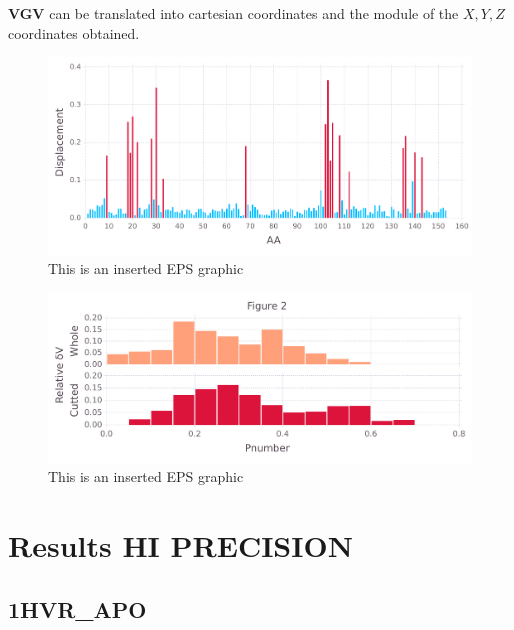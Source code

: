 \documentclass[10pt,letterpaper]{article}
\begin{document}
\FloatBarrier


\textbf{VGV} can be translated into cartesian coordinates and the module of the \(X, Y, Z\) coordinates obtained.

\begin{figure}[ht]
\begin{center}
\includegraphics[scale=0.5]{256l/5figure.pdf}
\caption{This is an inserted EPS graphic}
\label{fig13}
\end{center}
\end{figure}
              
\begin{figure}[ht]
\begin{center}
\includegraphics[scale=0.5]{256l/3_both.pdf}
\caption{This is an inserted EPS graphic}
\label{fig13}
\end{center}
\end{figure}

\FloatBarrier
\newpage

\section{Results HI PRECISION}
\subsection{1HVR\_APO}
\end{document}
